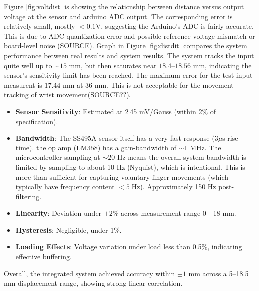 \documentclass[a4paper,12pt]{article}
\begin{document}
Figure \ref{fig:voltdist} is showing the relationship between distance versus output voltage at the sensor and arduino ADC output. The corresponding error is relatively small, mostly $< 0.1$V, suggesting the Arduino's ADC is fairly accurate. This is due to ADC quantization error and possible reference voltage mismatch or board-level noise (SOURCE). Graph in Figure \ref{fig:distdit} compares the system performance between real results and system results. The system tracks the input quite well up to $\sim 15$ mm, but then saturates near $18.4–18.56$ mm, indicating the sensor's sensitivity limit has been reached. The maximum error for the test input measurent is 17.44 mm at 36 mm. This is not acceptable for the movement tracking of wrist movement(SOURCE??).

\begin{itemize}
    \item \textbf{Sensor Sensitivity}: Estimated at 2.45 mV/Gauss (within 2\% of specification).
    \item \textbf{Bandwidth}: The SS495A sensor itself has a very fast response ($3 \mu$s rise time). the op amp (LM358) has a gain-bandwidth of $\sim 1$ MHz. The microcontroller sampling at $\sim 20$ Hz means the overall system bandwidth is limited by sampling to about 10 Hz (Nyquist), which is intentional. This is more than sufficient for capturing voluntary finger movements (which typically have frequency content $< 5$ Hz). Approximately 150 Hz post-filtering.
    \item \textbf{Linearity}: Deviation under $\pm2\%$ across measurement range 0 - 18 mm.
    \item \textbf{Hysteresis}: Negligible, under 1\%.
    \item \textbf{Loading Effects}: Voltage variation under load less than 0.5\%, indicating effective buffering.
\end{itemize}
\noindent
Overall, the integrated system achieved accuracy within $\pm 1$ mm across a 5--18.5 mm displacement range, showing strong linear correlation.


%
\end{document}
